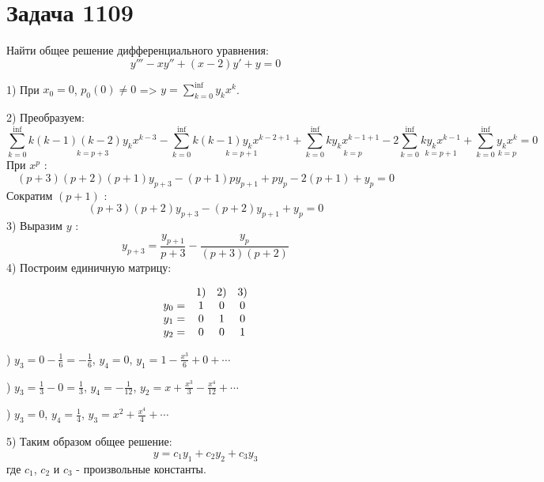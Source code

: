 \pagebreak\section*{Задача 1109}
Найти общее решение дифференциального уравнения: $$ y''' - xy'' + (x - 2)y' + y = 0 $$
\begin{solution}
    1) При $x_0 = 0 $, $ p_0(0) \neq 0 $ => $ y = \sum_{k = 0}^{\inf} y_k x^k $. \par
    2) Преобразуем: $$ \sum_{k = 0}^{\inf} \underset{k = p + 3}{k (k - 1) (k - 2) y_k x^{k - 3}} - \sum_{k = 0}^{\inf} \underset{k = p + 1}{k (k - 1) y_k x^{k -2 + 1}} + \sum_{k = 0}^{\inf} \underset{k = p}{k y_k x^{k - 1 + 1}} - 2 \sum_{k = 0}^{\inf} \underset{k = p + 1}{k y_k x^{k - 1}} + \sum_{k = 0}^{\inf} \underset{k = p}{y_k x^k} = 0 $$
    При $ x^p $ : $$ (p + 3) (p + 2) (p + 1) y_{p + 3} - (p + 1) p y_{p + 1} + p y_p - 2 (p + 1) + y_p = 0 $$
    Сократим $ (p + 1) $ : $$ (p + 3) (p + 2) y_{p + 3} - (p + 2) y_{p + 1} + y_p = 0 $$
    3) Выразим $ y $ : $$ y_{p + 3} = \frac{y_{p + 1}}{p + 3} - \frac{y_p}{(p + 3)(p + 2)} $$
    4) Построим единичную матрицу: \par
    $$\begin{array}{c ccc}
                      & 1) & 2) & 3) \\
                y_0 = & 1  & 0  & 0  \\
                y_1 = & 0  & 1  & 0  \\
                y_2 = & 0  & 0  & 1  \\
            \end{array}$$\par
    ) $ y_3 = 0 - \frac{1}{6} = -\frac{1}{6} $, $ y_4 = 0 $, $ y_1 = 1 - \frac{x^3}{6} + 0 + \cdots $\par
    ) $ y_3 = \frac{1}{3} - 0 = \frac{1}{3} $, $ y_4 = -\frac{1}{12} $, $ y_2 = x + \frac{x^3}{3} - \frac{x^4}{12} + \cdots $\par
    ) $ y_3 = 0 $, $ y_4 = \frac{1}{4} $, $ y_3 = x^2 + \frac{x^4}{4} + \cdots $\par
    5) Таким образом общее решение: $$ y = c_1y_1 + c_2y_2 + c_3y_3 $$ где $c_1$, $c_2$ и $c_3$ - произвольные константы.

\end{solution}\pagebreak